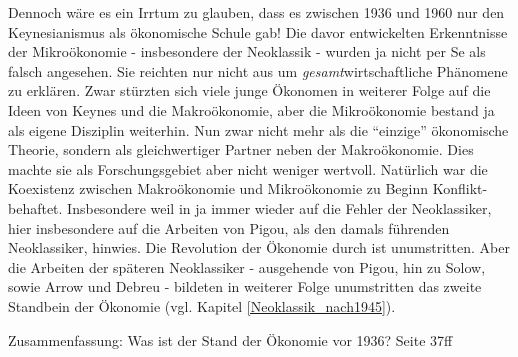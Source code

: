 Dennoch wäre es ein Irrtum zu glauben, dass es zwischen 1936 und 1960 nur den Keynesianismus als ökonomische Schule gab! 
Die davor entwickelten Erkenntnisse der Mikroökonomie - insbesondere der Neoklassik - wurden ja nicht per Se als falsch angesehen. Sie reichten nur nicht aus um \textit{gesamt}wirtschaftliche Phänomene zu erklären. Zwar stürzten sich viele junge Ökonomen in weiterer Folge auf die Ideen von Keynes und die Makroökonomie, aber die Mikroökonomie bestand ja als eigene Disziplin weiterhin. Nun zwar nicht mehr als die "`einzige"' ökonomische Theorie, sondern als gleichwertiger Partner neben der Makroökonomie. Dies machte sie als Forschungsgebiet aber nicht weniger wertvoll. Natürlich war die Koexistenz zwischen Makroökonomie und Mikroökonomie zu Beginn Konflikt-behaftet. Insbesondere weil in \textcite{Keynes1936} ja immer wieder auf die Fehler der Neoklassiker, hier insbesondere auf die Arbeiten von Pigou, als den damals führenden Neoklassiker, hinwies. Die Revolution der Ökonomie durch \textcite{Keynes1936} ist unumstritten. Aber die Arbeiten der späteren Neoklassiker - ausgehende von Pigou, hin zu Solow, sowie Arrow und Debreu - bildeten in weiterer Folge unumstritten das zweite Standbein der Ökonomie (vgl. Kapitel \ref{Neoklassik_nach1945}).







Zusammenfassung: Was ist der Stand der Ökonomie vor 1936?
Seite 37ff \textcite{Snowdon2005}